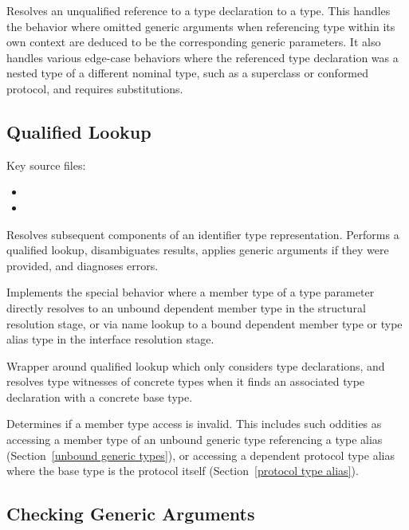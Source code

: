\documentclass[../generics]{subfiles}
\begin{document}
Resolves an unqualified reference to a type declaration to a type. This handles the behavior where omitted generic arguments when referencing type within its own context are deduced to be the corresponding generic parameters. It also handles various edge-case behaviors where the referenced type declaration was a nested type of a different nominal type, such as a superclass or conformed protocol, and requires substitutions.

\subsection*{Qualified Lookup}

Key source files:
\begin{itemize}
\item {}
\item {}
\end{itemize}

Resolves subsequent components of an identifier type representation. Performs a qualified lookup, disambiguates results, applies generic arguments if they were provided, and diagnoses errors.

Implements the special behavior where a member type of a type parameter directly resolves to an unbound dependent member type in the structural resolution stage, or via name lookup to a bound dependent member type or type alias type in the interface resolution stage.

Wrapper around qualified lookup which only considers type declarations, and resolves type witnesses of concrete types when it finds an associated type declaration with a concrete base type.

Determines if a member type access is invalid. This includes such oddities as accessing a member type of an unbound generic type referencing a type alias (Section~\ref{unbound generic types}), or accessing a dependent protocol type alias where the base type is the protocol itself (Section~\ref{protocol type alias}).

\subsection*{Checking Generic Arguments}
\end{document}

